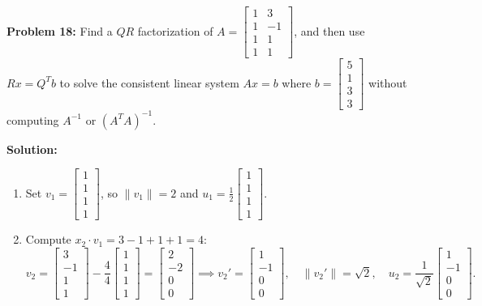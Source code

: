 \documentclass[11pt, letterpaper]{article}
\theoremstyle{definition}
\theoremstyle{remark}
\begin{document}
\vspace{0.8em}

\textbf{Problem 18:} Find a $QR$ factorization of $A = \begin{bmatrix} 1 & 3 \\ 1 & -1 \\ 1 & 1 \\ 1 & 1 \end{bmatrix}$, and then use $Rx = Q^T b$ to solve the consistent linear system $Ax = b$ where $b = \begin{bmatrix} 5 \\ 1 \\ 3 \\ 3 \end{bmatrix}$ without computing $A^{-1}$ or $(A^T A)^{-1}$.

\textbf{Solution:}
\begin{enumerate}[label=\textbf{Step \arabic*:}]
    \item Set $v_1 = \begin{bmatrix} 1 \\ 1 \\ 1 \\ 1 \end{bmatrix}$, so $\|v_1\| = 2$ and $u_1 = \frac{1}{2}\begin{bmatrix} 1 \\ 1 \\ 1 \\ 1 \end{bmatrix}$.
    \item Compute $x_2 \cdot v_1 = 3 - 1 + 1 + 1 = 4$:
    \[
        v_2 = \begin{bmatrix} 3 \\ -1 \\ 1 \\ 1 \end{bmatrix} - \frac{4}{4}\begin{bmatrix} 1 \\ 1 \\ 1 \\ 1 \end{bmatrix} = \begin{bmatrix} 2 \\ -2 \\ 0 \\ 0 \end{bmatrix} \implies v_2' = \begin{bmatrix} 1 \\ -1 \\ 0 \\ 0 \end{bmatrix}, \quad \|v_2'\| = \sqrt{2}, \quad u_2 = \frac{1}{\sqrt{2}}\begin{bmatrix} 1 \\ -1 \\ 0 \\ 0 \end{bmatrix}.
\]
\end{enumerate}
\end{document}
